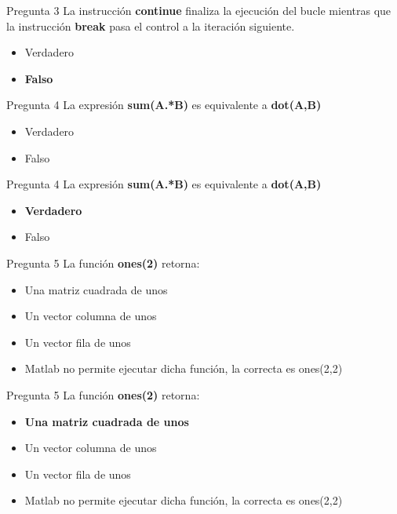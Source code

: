 \documentclass{bredelebeamer}
\begin{document}
\begin{frame}{Pregunta 3}
La instrucción \textbf{continue} finaliza la ejecución del bucle mientras que la instrucción \textbf{break} pasa el control a la iteración siguiente.
\begin{itemize}
\item Verdadero
\item \textbf{Falso}
\end{itemize}
\end{frame}

\begin{frame}{Pregunta 4}
La expresión \textbf{sum(A.*B)}  es equivalente a \textbf{dot(A,B)}
\begin{itemize}
\item Verdadero
\item Falso
\end{itemize}
\end{frame}

\begin{frame}{Pregunta 4}
La expresión \textbf{sum(A.*B)}  es equivalente a \textbf{dot(A,B)}
\begin{itemize}
\item \textbf{Verdadero}
\item Falso
\end{itemize}
\end{frame}

\begin{frame}{Pregunta 5}
La función \textbf{ones(2)} retorna:
\begin{itemize}
\item Una matriz cuadrada de unos
\item Un vector columna de unos
\item Un vector fila de unos
\item Matlab no permite ejecutar dicha función, la correcta es ones(2,2)
\end{itemize}
\end{frame}

\begin{frame}{Pregunta 5}
La función \textbf{ones(2)} retorna:
\begin{itemize}
\item \textbf{Una matriz cuadrada de unos}
\item Un vector columna de unos
\item Un vector fila de unos
\item Matlab no permite ejecutar dicha función, la correcta es ones(2,2)
\end{itemize}
\end{frame}
\end{document}
